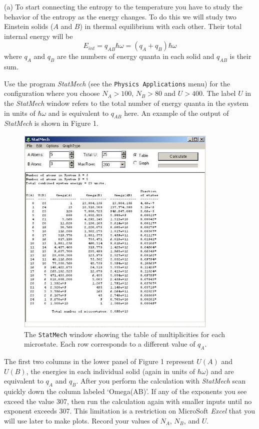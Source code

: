 (a) To start connecting the entropy to the temperature you have to study the 
behavior of the entropy as the energy changes.
To do this we will study two Einstein solids ($A$ and $B$) in thermal equilibrium with 
each other.
Their total internal energy will be
\begin{equation}
E_{int} = q_{AB}\hbar \omega = (q_A + q_B) \hbar \omega
\end{equation}
where $q_A$ and $q_B$ are the numbers of energy quanta in each solid and $q_{AB}$ is 
their sum.

Use the program {\it StatMech} (see the {\tt Physics Applications} menu)
for the configuration where you choose $N_A > 100$, $N_B > 80$ and $U>400$.
The label $U$ in the {\it StatMech} window refers to the total number of energy quanta 
in the system
in units of $\hbar \omega$ and is equivalent to $q_{AB}$ here.
An example of the output of {\it StatMech} is shown in Figure 1.
\begin{figure}[h!]
\begin{center}
\includegraphics[height=4.0in]{S+T/statmech1.eps}
\caption{The {\tt StatMech} window showing the table of multiplicities for each microstate.
Each row corresponds to a different value of $q_A$.}
\end{center}
\end{figure}
The first two columns in the lower panel of Figure 1 represent $U(A)$ and $U(B)$, 
the energies in each 
individual solid (again in units of $\hbar \omega$) and are equivalent to $q_A$ and $q_B$.
After you perform the calculation with {\it StatMech} scan quickly down the column
labeled `Omega(AB)'.
If any of the exponents you see exceed the value 307, then run the calculation again with 
smaller inputs until no exponent exceeds 307.
This limitation is a restriction on MicroSoft {\it Excel} that you will use later to make
plots.
Record your values of $N_A$, $N_B$, and $U$.
\vspace{15mm}

